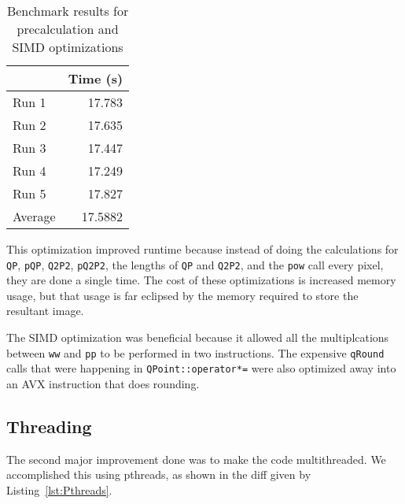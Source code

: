 \documentclass[12pt]{article}
\begin{document}

\begin{table}[H]
  \centering
  \begin{tabular}{lr}
    & {\bf Time (s)} \\
    \hline
    Run 1 & 17.783 \\
    Run 2 & 17.635 \\
    Run 3 & 17.447 \\
    Run 4 & 17.249 \\
    Run 5 & 17.827 \\
    \hline
    Average & 17.5882 \\
  \end{tabular}
  \caption{Benchmark results for precalculation and SIMD optimizations}
  \label{tbl-precalculation}
\end{table}

This optimization improved runtime because instead of doing the
calculations for \texttt{QP}, \texttt{pQP}, \texttt{Q2P2},
\texttt{pQ2P2}, the lengths of \texttt{QP} and \texttt{Q2P2}, and the
\texttt{pow} call every pixel, they are done a single time. The cost
of these optimizations is increased memory usage, but that usage is
far eclipsed by the memory required to store the resultant image.

The SIMD optimization was beneficial because it allowed all the
multiplcations between \texttt{ww} and \texttt{pp} to be performed in
two instructions. The expensive \texttt{qRound} calls that were
happening in \texttt{QPoint::operator*=} were also optimized away into
an AVX instruction that does rounding.

\subsection*{Threading}

The second major improvement done was to make the code multithreaded. We accomplished this using pthreads, as shown in the diff given by Listing~\ref{lst:Pthreads}.
\end{document}
